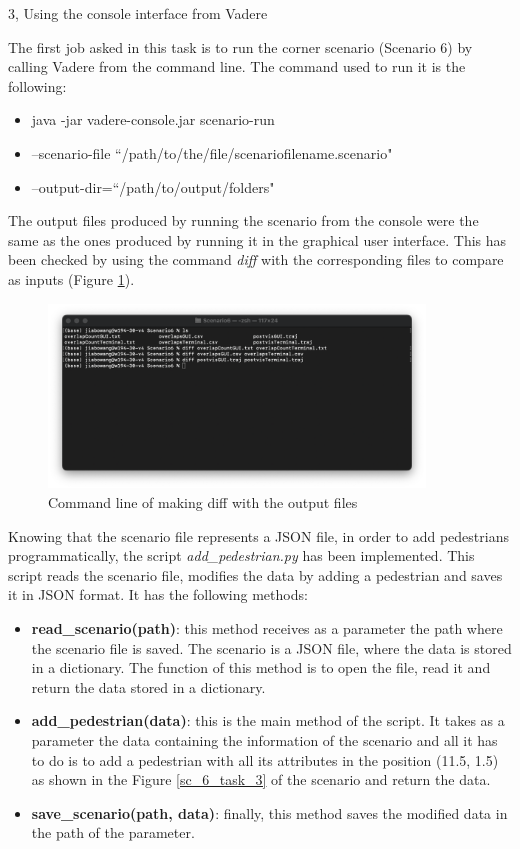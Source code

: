 \documentclass[10pt,a4paper]{article}
\begin{document}
\begin{task}{3, Using the console interface from Vadere}


The first job asked in this task is to run the corner scenario (Scenario 6) by calling Vadere from the command line. The command used to run it is the following:
\begin{itemize}
  \item[] java -jar vadere-console.jar scenario-run
  \item[] --scenario-file ``/path/to/the/file/scenariofilename.scenario"
  \item[] --output-dir=``/path/to/output/folders"
\end{itemize}

The output files produced by running the scenario from the console were the same as the ones produced by running it in the graphical user interface. This has been checked by using the command \textit{diff} with the corresponding files to compare as inputs (Figure \ref{diff}).

\begin{figure} [H]
    \includegraphics[width=10cm]{images/diff.png}
    \centering
    \caption{Command line of making diff with the output files}
    \label{diff}
\end{figure}


Knowing that the scenario file represents a JSON file, in order to add pedestrians programmatically, the script \textit{add\_pedestrian.py} has been implemented. This script reads the scenario file, modifies the data by adding a pedestrian and saves it in JSON format. It has the following methods:
\begin{itemize}
  \item \textbf{read\_scenario(path)}: this method receives as a parameter the path where the scenario file is saved. The scenario is a JSON file, where the data is stored in a dictionary. The function of this method is to open the file, read it and return the data stored in a dictionary.
  \item \textbf{add\_pedestrian(data)}: this is the main method of the script. It takes as a parameter the data containing the information of the scenario and all it has to do is to add a pedestrian with all its attributes in the position (11.5, 1.5) as shown in the Figure \ref{sc_6_task_3} of the scenario and return the data. 
  \item \textbf{save\_scenario(path, data)}: finally, this method saves the modified data in the path of the parameter. 
\end{itemize}


\end{task}
\end{document}
